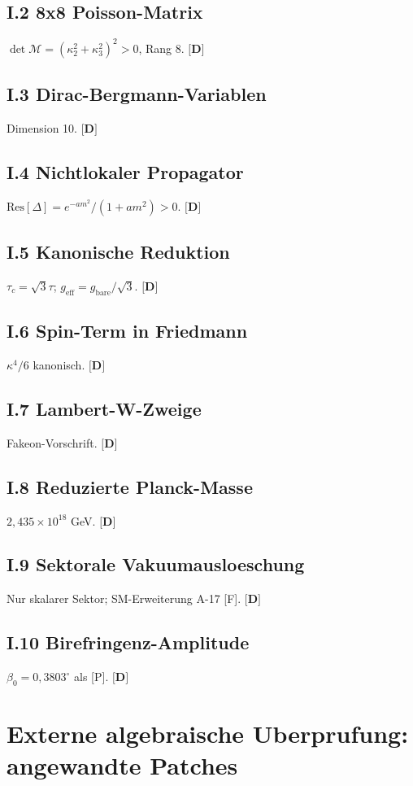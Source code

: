 ﻿\documentclass[11pt,letterpaper]{article}
\begin{document}
\subsection{I.2 8x8 Poisson-Matrix}
$\det\mathcal{M} = (\kappa_2^2 + \kappa_3^2)^2 > 0$, Rang 8. $\textbf{[D]}$
\subsection{I.3 Dirac-Bergmann-Variablen}
Dimension 10. $\textbf{[D]}$
\subsection{I.4 Nichtlokaler Propagator}
$\mathrm{Res}[\Delta] = e^{-am^2}/(1+am^2) > 0$. $\textbf{[D]}$
\subsection{I.5 Kanonische Reduktion}
$\tau_c = \sqrt{3}\tau$; $g_{\mathrm{eff}} = g_{\mathrm{bare}}/\sqrt{3}$. $\textbf{[D]}$
\subsection{I.6 Spin-Term in Friedmann}
$\kappa^4/6$ kanonisch. $\textbf{[D]}$
\subsection{I.7 Lambert-W-Zweige}
Fakeon-Vorschrift. $\textbf{[D]}$
\subsection{I.8 Reduzierte Planck-Masse}
$2{,}435 \times 10^{18}$ GeV. $\textbf{[D]}$
\subsection{I.9 Sektorale Vakuumausloeschung}
Nur skalarer Sektor; SM-Erweiterung A-17 [F]. $\textbf{[D]}$
\subsection{I.10 Birefringenz-Amplitude}
$\beta_0 = 0{,}3803^\circ$ als [P]. $\textbf{[D]}$
\section{Externe algebraische Uberprufung: angewandte Patches}
\end{document}
